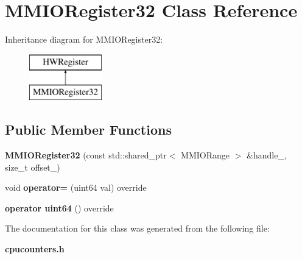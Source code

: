 \section{M\+M\+I\+O\+Register32 Class Reference}
\label{classMMIORegister32}
Inheritance diagram for M\+M\+I\+O\+Register32\+:\begin{figure}[H]
\begin{center}
\leavevmode
\includegraphics[height=2.000000cm]{classMMIORegister32}
\end{center}
\end{figure}
\subsection*{Public Member Functions}
\begin{DoxyCompactItemize}
\item 
\mbox{\label{classMMIORegister32_a1cd6f5707c82773026861a9131bf925c}} 
{\bfseries M\+M\+I\+O\+Register32} (const std\+::shared\+\_\+ptr$<$ M\+M\+I\+O\+Range $>$ \&handle\+\_\+, size\+\_\+t offset\+\_\+)
\item 
\mbox{\label{classMMIORegister32_aca454f4aed4db21453c0e56c980a1707}} 
void {\bfseries operator=} (uint64 val) override
\item 
\mbox{\label{classMMIORegister32_a29fcae2b0d26be462a4ff4ddb6546e63}} 
{\bfseries operator uint64} () override
\end{DoxyCompactItemize}


The documentation for this class was generated from the following file\+:\begin{DoxyCompactItemize}
\item 
\textbf{ cpucounters.\+h}\end{DoxyCompactItemize}
